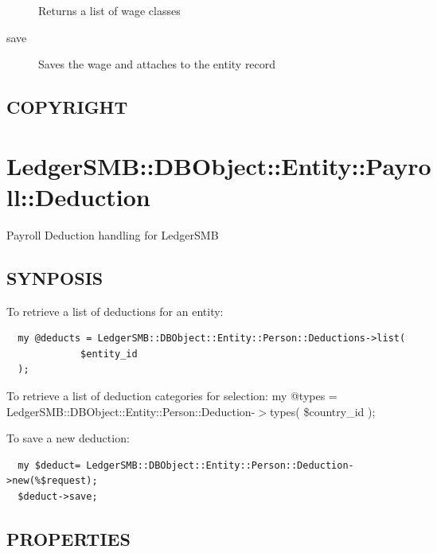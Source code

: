 \begin{description}
\begin{description}
\begin{description}
\begin{description}
\begin{description}
\begin{description}
\begin{description}
\begin{description}
\begin{description}
Returns a list of wage classes


\item[{save}] \mbox{}

Saves the wage and attaches to the entity record

\end{description}
\subsection*{COPYRIGHT\label{LedgerSMB::DBObject::Entity::Payroll::Wage_COPYRIGHT}}
\section{LedgerSMB::DBObject::Entity::Payroll::Deduction\label{LedgerSMB::DBObject::Entity::Payroll::Deduction}}


Payroll Deduction handling for
LedgerSMB

\subsection*{SYNPOSIS\label{LedgerSMB::DBObject::Entity::Payroll::Deduction_SYNPOSIS}}


To retrieve a list of deductions for an entity:

\begin{verbatim}
  my @deducts = LedgerSMB::DBObject::Entity::Person::Deductions->list(
             $entity_id
  );
\end{verbatim}


To retrieve a list of deduction categories for selection:
  my @types = LedgerSMB::DBObject::Entity::Person::Deduction-$>$types(
              \$country\_id
  );



To save a new deduction:

\begin{verbatim}
  my $deduct= LedgerSMB::DBObject::Entity::Person::Deduction->new(%$request);
  $deduct->save;
\end{verbatim}
\subsection*{PROPERTIES\label{LedgerSMB::DBObject::Entity::Payroll::Deduction_PROPERTIES}}
\begin{description}


\end{description}
\end{description}
\end{description}
\end{description}
\end{description}
\end{description}
\end{description}
\end{description}
\end{description}
